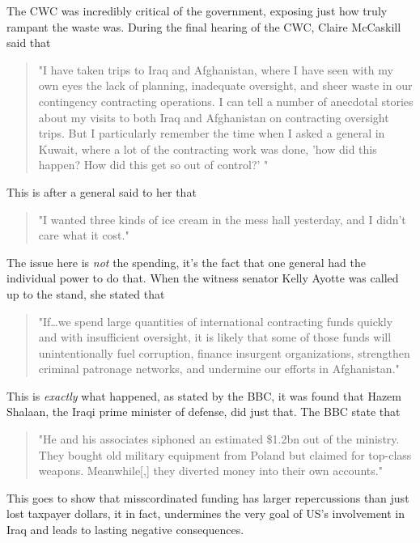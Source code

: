 \documentclass{article}
\begin{document}
        The CWC was incredibly critical of the government, exposing just how truly rampant the waste was. During the final hearing of the CWC, Claire McCaskill said that 
        \begin{quote}
            "I have taken trips to Iraq and Afghanistan, where I have seen with my own eyes the lack of planning, inadequate oversight, and sheer waste in our contingency contracting operations. I can tell a number of anecdotal stories about my visits to both Iraq and Afghanistan on contracting oversight trips. But I particularly remember the time when I asked a general in Kuwait, where a lot of the contracting work was done, 'how did this happen? How did this get so out of control?' \cite{us_senate2011wartime_contracting}"
        \end{quote}
        This is after a general said to her that 
        \begin{quote}
            "I wanted three kinds of ice cream in the mess hall yesterday, and I didn’t care what it cost." \cite{us_senate2011wartime_contracting}
        \end{quote}
        The issue here is \textit{not} the spending, it's the fact that one general had the individual power to do that. 
        When the witness senator Kelly Ayotte was called up to the stand, she stated that \begin{quote}
            "If\ldots we spend large quantities of international contracting funds quickly and with insufficient oversight, it is likely  that some of those funds will unintentionally fuel corruption, finance insurgent organizations, strengthen criminal patronage networks, and undermine our efforts in Afghanistan." \cite{us_senate2011wartime_contracting}
        \end{quote}
        This is \textit{exactly} what happened, as stated by the BBC, it was found that Hazem Shalaan, the Iraqi prime minister of defense, did just that. The BBC state that
        \begin{quote}
            "He and his associates siphoned an estimated \$1.2bn out of the ministry. They bought old military equipment from Poland but claimed for top-class weapons. Meanwhile[,] they diverted money into their own accounts."
        \end{quote}
        This goes to show that misscordinated funding has larger repercussions than just lost taxpayer dollars, it in fact, undermines the very goal of US's involvement in Iraq and leads to lasting negative consequences. 
\end{document}
